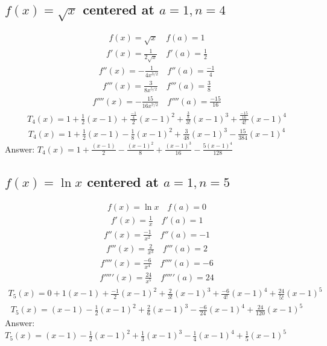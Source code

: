 \documentclass{article}
\begin{document}
\subsection{$f(x) = \sqrt{x}$ centered at $a = 1, n = 4$}
\begin{align*}
	f(x) = \sqrt{x} \quad f(a) = 1
\end{align*}
\begin{align*}
	f'(x) = \frac{1}{2\sqrt{x}} \quad f'(a) = \frac{1}{2}
\end{align*}
\begin{align*}
	f''(x) = -\frac{1}{4x^{3/2}} \quad f''(a) = \frac{-1}{4}
\end{align*}
\begin{align*}
	f'''(x) = \frac{3}{8x^{5/2}} \quad f'''(a) = \frac{3}{8}
\end{align*}
\begin{align*}
	f''''(x) = -\frac{15}{16x^{7/2}} \quad f''''(a) = \frac{-15}{16}
\end{align*}
\begin{align*}
	T_4(x) = 1 + \frac{1}{2}(x - 1) + \frac{\frac{-1}{4}}{2}(x - 1)^2 + \frac{\frac{3}{8}}{3!}(x - 1)^3 + \frac{\frac{-15}{16}}{4!} (x - 1)^4
\end{align*}
\begin{align*}
	T_4(x) = 1 + \frac{1}{2}(x - 1) - \frac{1}{8} (x - 1)^2 + \frac{3}{48} (x - 1)^3 - \frac{15}{384} (x - 1)^4
\end{align*}
Answer: $T_4 (x) = 1 + \frac{(x - 1)}{2} - \frac{(x - 1)^2}{8} + \frac{(x - 1)^3}{16} - \frac{5(x - 1)^4}{128}$

\subsection{$f(x) = \ln{x}$ centered at $a = 1, n = 5$}
\begin{align*}
	f(x) = \ln{x} \quad f(a) = 0
\end{align*}
\begin{align*}
	f'(x) = \frac{1}{x} \quad f'(a) = 1
\end{align*}
\begin{align*}
	f''(x) = \frac{-1}{x^2} \quad f''(a) = -1
\end{align*}
\begin{align*}
	f'''(x) = \frac{2}{x^3} \quad f'''(a) = 2
\end{align*}
\begin{align*}
	f''''(x) = \frac{-6}{x^4} \quad f''''(a) = -6
\end{align*}
\begin{align*}
	f'''''(x) = \frac{24}{x^5} \quad f'''''(a) = 24
\end{align*}
\begin{align*}
	T_5(x) = 0 + 1(x - 1) + \frac{-1}{2}(x - 1)^2 + \frac{2}{3!}(x - 1)^3 + \frac{-6}{4!}(x - 1)^4 + \frac{24}{5!}(x - 1)^5
\end{align*}
\begin{align*}
	T_5 (x) = (x - 1) - \frac{1}{2} (x - 1)^2 + \frac{2}{6} (x - 1)^3 - \frac{-6}{24} (x - 1)^4 + \frac{24}{120} (x - 1)^5
\end{align*}
Answer: $T_5 (x) = (x - 1) - \frac{1}{2} (x - 1)^2 + \frac{1}{3} (x - 1)^3 - \frac{1}{4} (x - 1)^4 + \frac{1}{5} (x - 1)^5$
\end{document}
